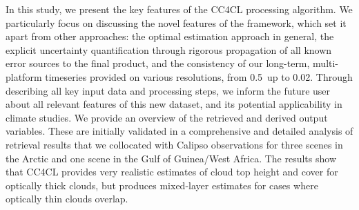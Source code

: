In this study, we present the key features of the CC4CL processing algorithm. We particularly focus on discussing the novel features of the framework, which set it apart from other approaches: the optimal estimation approach in general, the explicit uncertainty quantification through rigorous propagation of all known error sources to the final product, and the consistency of our long-term, multi-platform timeseries provided on various resolutions, from 0.5\textdegree\ up to 0.02\textdegree. Through describing all key input data and processing steps, we inform the future user about all relevant features of this new dataset, and its potential applicability in climate studies. We provide an overview of the retrieved and derived output variables. These are initially validated in a comprehensive and detailed analysis of retrieval results that we collocated with Calipso observations for three scenes in the Arctic and one scene in the Gulf of Guinea/West Africa. The results show that CC4CL provides very realistic estimates of cloud top height and cover for optically thick clouds, but produces mixed-layer estimates for cases where optically thin clouds overlap. %



